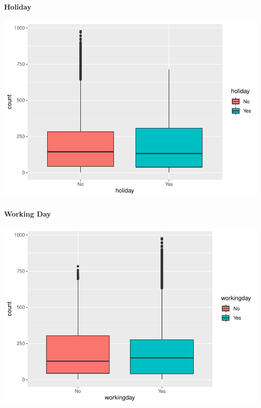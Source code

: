 \documentclass[american,]{article}
\let\oldparagraph\paragraph
\renewcommand{\paragraph}[1]{\oldparagraph{#1}\mbox{}}
\begin{document}
\newpage

\hypertarget{holiday}{%
\paragraph{Holiday}\label{holiday}}

\includegraphics{BikeSharingDemand_files/figure-latex/train.mod.1.holiday-1.pdf}

\hypertarget{working-day}{%
\paragraph{Working Day}\label{working-day}}

\includegraphics{BikeSharingDemand_files/figure-latex/train.mod.1.workingday-1.pdf}

\newpage
\end{document}
